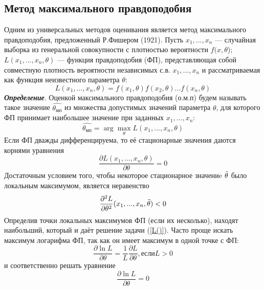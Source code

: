 \documentclass[a4paper,14pt]{article}
\begin{document}
	\subsection{Метод максимального правдоподобия}
	\noindent Одним из универсальных методов оценивания является метод максимального правдоподобия, предложенный Р.Фишером (1921).
	Пусть $x_{1},...,x_{n}$ — случайная выборка из генеральной совокупности с плотностью вероятности $f(x,\theta$); $L(x_{1},... ,x_{n}, \theta)$ — функция правдоподобия (ФП), представляющая собой совместную плотность вероятности независимых с.в. $x_{1}, ... ,x_{n}$ и рассматриваемая как функция неизвестного параметра $\theta$:
	\begin{equation}
		L(x_{1},...,x_{n},\theta) = f(x_{1},\theta)f(x_{2},\theta)...f(x_{n}, \theta)
		\label{L()}
	\end{equation}
	\textbf{\textit{Определение}}. Оценкой максимального правдоподобия (о.м.п) будем называть такое значение $\hat{\theta_{мп}}$ из множества допустимых значений параметра $\theta$, для которого ФП принимает наибольшее значение при заданных $x_{1},...,x_{n}$:
	\begin{equation}
		\hat{\theta_{мп}} = \arg \max_{\theta}L(x_{1},...,x_{n},\theta)
		\label{theta_mp}
	\end{equation}
	Если ФП дважды дифференцируема, то её стационарные значения даются корнями уравнения
	\begin{equation}
		\frac{\partial L(x_{1},...,x_{n},\theta)}{\partial \theta} = 0
		\label{eq_min}
	\end{equation}
	Достаточным условием того, чтобы некоторое стационарное значениe $\Tilde{\theta}$ было локальным максимумом, является неравенство
	\begin{equation}
		\frac{\partial^{2}L}{\partial \theta^{2}}(x_{1},...,x_{n},\Tilde{\theta}) < 0
		\label{ineq_min}
	\end{equation}
	Определив точки локальных максимумов ФП (если их несколько), находят наибольший, который и даёт решение задачи (\ref{L()}).
	Часто проще искать максимум логарифма ФП, так как он имеет максимум в одной точке с ФП:
	\begin{equation}
		\frac{\partial \ln L}{\partial \theta}=\frac{1}{L}\frac{\partial L}{\partial \theta}, если L > 0
		\label{log_max}
	\end{equation}
	и соответственно решать уравнение
	\begin{equation}
		\frac{\partial \ln L}{\partial \theta}= 0
		\label{log_m=0}
	\end{equation}
\end{document}
